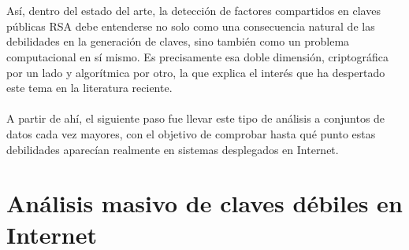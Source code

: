 \\
\\
Así, dentro del estado del arte, la detección de factores compartidos en claves públicas RSA debe entenderse no solo como una consecuencia natural de las debilidades en la generación de claves, sino también como un problema computacional en sí mismo. Es precisamente esa doble dimensión, criptográfica por un lado y algorítmica por otro, la que explica el interés que ha despertado este tema en la literatura reciente.
\\
\\
A partir de ahí, el siguiente paso fue llevar este tipo de análisis a conjuntos de datos cada vez mayores, con el objetivo de comprobar hasta qué punto estas debilidades aparecían realmente en sistemas desplegados en Internet.

\section{Análisis masivo de claves débiles en Internet}

